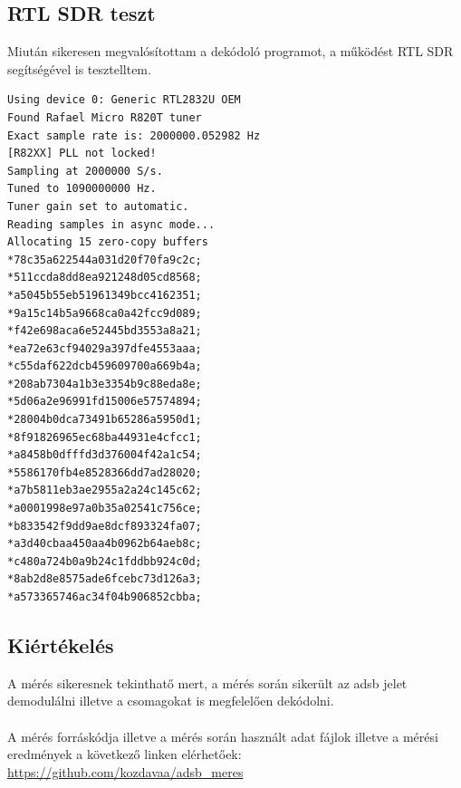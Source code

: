 \newpage
\subsection{RTL SDR teszt}
Miután sikeresen megvalósítottam a dekódoló programot, a működést RTL SDR segítségével is tesztelltem.
\begin{lstlisting}
Using device 0: Generic RTL2832U OEM
Found Rafael Micro R820T tuner
Exact sample rate is: 2000000.052982 Hz
[R82XX] PLL not locked!
Sampling at 2000000 S/s.
Tuned to 1090000000 Hz.
Tuner gain set to automatic.
Reading samples in async mode...
Allocating 15 zero-copy buffers
*78c35a622544a031d20f70fa9c2c;
*511ccda8dd8ea921248d05cd8568;
*a5045b55eb51961349bcc4162351;
*9a15c14b5a9668ca0a42fcc9d089;
*f42e698aca6e52445bd3553a8a21;
*ea72e63cf94029a397dfe4553aaa;
*c55daf622dcb459609700a669b4a;
*208ab7304a1b3e3354b9c88eda8e;
*5d06a2e96991fd15006e57574894;
*28004b0dca73491b65286a5950d1;
*8f91826965ec68ba44931e4cfcc1;
*a8458b0dfffd3d376004f42a1c54;
*5586170fb4e8528366dd7ad28020;
*a7b5811eb3ae2955a2a24c145c62;
*a0001998e97a0b35a02541c756ce;
*b833542f9dd9ae8dcf893324fa07;
*a3d40cbaa450aa4b0962b64aeb8c;
*c480a724b0a9b24c1fddbb924c0d;
*8ab2d8e8575ade6fcebc73d126a3;
*a573365746ac34f04b906852cbba;
\end{lstlisting}

\subsection{Kiértékelés}
A mérés sikeresnek tekinthatő mert, a mérés során sikerült az adsb jelet demodulálni illetve a csomagokat is megfelelően dekódolni.\\
\\
A mérés forráskódja illetve a mérés során használt adat fájlok illetve a mérési eredmények a következő linken elérhetőek: \url{https://github.com/kozdavaa/adsb_meres}
